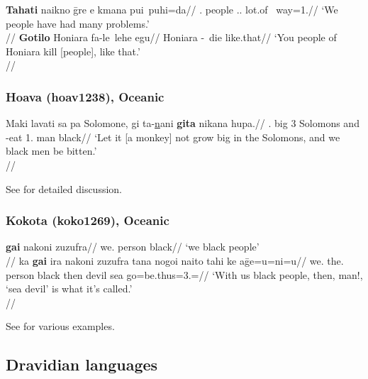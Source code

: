 \pex 
\a \begingl
\gla \textbf{Tahati} naikno \={g}re e kmana pui~puhi=da//
\Pl.\Incl{} people \Dem.\Prox.\Pl{} \Emph{} lot.of \Dur~way=1\Pl.\Poss{}//
\glft `We people have had many problems.'\\\citep[165, (591)]{boswell2018}//
\endgl
\a \begingl
\gla \textbf{Gotilo} Honiara fa-le~lehe egu//
\Pl{} Honiara \Caus-\Dur~die like.that//
\glft `You people of Honiara kill [people], like that.'\\\citep[99, (301)]{boswell2018}//
\endgl
\xe


\subsubsection{Hoava (hoav1238), Oceanic}


\ex \begingl
\gla Maki lavati sa pa Solomone, gi ta-\underline{n}ani \textbf{gita} nikana hupa.//
\glb \Neg{}.\Imp{} big 3\Sg{} \Loc{} Solomons and \Pass-eat 1\Pl.\Incl{} man black//
\glft `Let it [a monkey] not grow big in the Solomons, and we black men be bitten.'\\\citep[after][48, (72a)]{davis2003}//
\endgl
\xe

See \citealp{palmer2017} for detailed discussion.

\subsubsection{Kokota (koko1269), Oceanic}

\pex
\a 
\begingl
\gla \textbf{gai} nakoni zuzufra//
\glb we.\Excl{} person black//
\glft `we black people'\\\citep[95, (3.70a)]{palmer2008}//
\endgl
\a 
\begingl
\gla ka \textbf{gai} ira nakoni zuzufra tana nogoi naito tahi ke a\={g}e=u=ni=u//
\glb \Loc{} we.\Incl{} the.\Pl{} person black then \Voc{} devil sea \Pfv{} go=be.thus=3\Sg.\Obj=\Cnt//
\glft `With us black people, then, man!, `sea devil' is what it's called.' \\\citep[123, (4.1b)]{palmer2008}//
\endgl
\xe

See \citet[68, 95, 116, 119, 123, 131, 137, 163, 242, 300, 305, 327, 399, 414]{palmer2008} for various examples.

\subsection{Dravidian languages}



